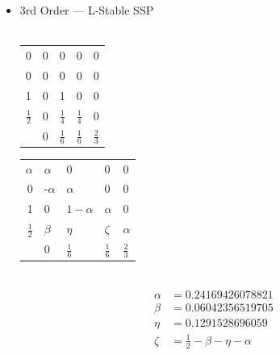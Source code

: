 \documentclass[10pt]{beamer}
\begin{document}
      \begin{frame}
        \begin{itemize}
          \item 3rd Order --- L-Stable SSP \hfill \\ \hfill \\
            \begin{tabular}{r|llll}
              0 & 0 & 0 & 0 & 0 \\
              0 & 0 & 0 & 0 & 0 \\
              1 & 0 & 1 & 0 & 0 \\
              \(\frac{1}{2}\) & 0 & \(\frac{1}{4}\) & \(\frac{1}{4}\) & 0 \\
              \midrule
                & 0 & \(\frac{1}{6}\) & \(\frac{1}{6}\) & \(\frac{2}{3}\) \\
            \end{tabular} \hspace{0.5cm}
            \begin{tabular}{r|llll}
              \(\alpha \) & \(\alpha \) & 0 & 0 & 0 \\
              0 & -\(\alpha \) & \(\alpha \) & 0 & 0 \\
              1 & 0 & \(1 - \alpha \) & \(\alpha \) & 0 \\
              \(\frac{1}{2}\) & \(\beta \) & \(\eta \) & \(\zeta \) & \(\alpha \) \\
              \midrule
                & 0 & \(\frac{1}{6}\) & \(\frac{1}{6}\) & \(\frac{2}{3}\) \\
            \end{tabular} \\
            \begin{align*}
              \alpha &= 0.24169426078821 \\
              \beta &= 0.06042356519705 \\
              \eta &= 0.1291528696059 \\
              \zeta &= \frac{1}{2} - \beta - \eta - \alpha
            \end{align*}
        \end{itemize}
      \end{frame}
\end{document}
